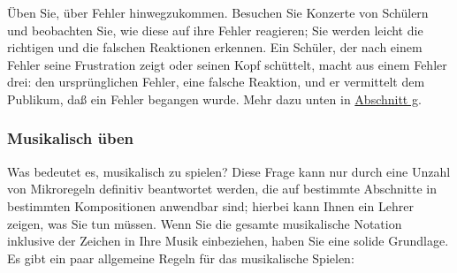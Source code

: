 Üben Sie, über Fehler hinwegzukommen.
Besuchen Sie Konzerte von Schülern und beobachten Sie, wie diese auf ihre Fehler reagieren; Sie werden leicht die richtigen und die falschen Reaktionen erkennen.
Ein Schüler, der nach einem Fehler seine Frustration zeigt oder seinen Kopf schüttelt, macht aus einem Fehler drei: den ursprünglichen Fehler, eine falsche Reaktion, und er vermittelt dem Publikum, daß ein Fehler begangen wurde.
Mehr dazu unten in \hyperref[c1iii14g]{Abschnitt g}.


\label{c1iii14musikalisch}
\subsubsection{Musikalisch üben}
\label{c1iii14d}

Was bedeutet es, musikalisch zu spielen?
Diese Frage kann nur durch eine Unzahl von Mikroregeln definitiv beantwortet werden, die auf bestimmte Abschnitte in bestimmten Kompositionen anwendbar sind; hierbei kann Ihnen ein Lehrer zeigen, was Sie tun müssen.
Wenn Sie die gesamte musikalische Notation inklusive der Zeichen in Ihre Musik einbeziehen, haben Sie eine solide Grundlage.
Es gibt ein paar allgemeine Regeln für das musikalische Spielen:

